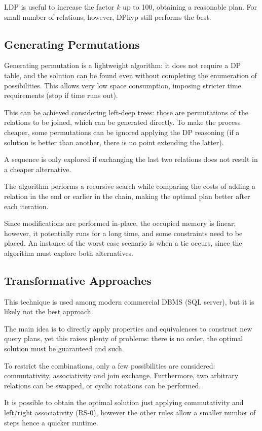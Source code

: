 LDP is useful to increase the factor $k$ up to 100, obtaining a reasonable plan. For small number of relations, however, DPhyp still performs the best. 

\subsection{Generating Permutations}
Generating permutation is a lightweight algorithm: it does not require a DP table, and the solution can be found even without completing the enumeration of possibilities. This allows very low space consumption, imposing stricter time requirements (stop if time runs out).

This can be achieved considering left-deep trees: those are permutations of the relations to be joined, which can be generated directly. To make the process cheaper, some permutations can be ignored applying the DP reasoning (if a solution is better than another, there is no point extending the latter).

A sequence is only explored if exchanging the last two relations does not result in a cheaper alternative. 

The algorithm performs a recursive search while comparing the costs of adding a relation in the end or earlier in the chain, making the optimal plan better after each iteration. 

Since modifications are performed in-place, the occupied memory is linear; however, it potentially runs for a long time, and some constraints need to be placed. An instance of the worst case scenario is when a tie occurs, since the algorithm must explore both alternatives. 

\subsection{Transformative Approaches}
This technique is used among modern commercial DBMS (SQL server), but it is likely not the best approach. 

The main idea is to directly apply properties and equivalences to construct new query plans, yet this raises plenty of problems: there is no order, the optimal solution must be guaranteed and such. 

To restrict the combinations, only a few possibilities are considered: commutativity, associativity and join exchange. Furthermore, two arbitrary relations can be swapped, or cyclic rotations can be performed. 

It is possible to obtain the optimal solution just applying commutativity and left/right associativity (RS-0), however the other rules allow a smaller number of steps hence a quicker runtime.

